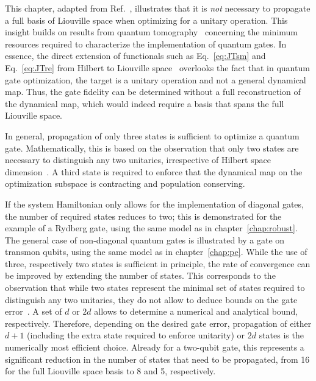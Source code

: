This chapter, adapted from Ref.~\cite{Goerz3States}, illustrates that it is
\emph{not} necessary to propagate a full basis of Liouville space when
optimizing for a unitary operation. This insight builds on results from quantum
tomography~\cite{ReichKochPRA13, ReichKochPRL13, ReichPhD2015} concerning the minimum
resources required to characterize the implementation of quantum gates.
In essence, the direct extension of functionals such as Eq.~\eqref{eq:JTsm} and
Eq.~\eqref{eq:JTre} from Hilbert to
Liouville space~\cite{KallushPRA06,OhtsukiNJP10,ToSHJPB11}
overlooks the fact that in quantum gate optimization,
the target is a unitary operation and not a general dynamical map.
Thus, the gate fidelity can be determined without a full reconstruction of the
dynamical map, which would indeed require a basis that spans the full Liouville
space.

In general, propagation of only three states is sufficient to optimize a quantum
gate. Mathematically, this is based on the observation that only two states are
necessary to distinguish any two unitaries, irrespective of Hilbert space
dimension~\cite{ReichKochPRA13}.
A third state is required to enforce that the dynamical map on the optimization
subspace is contracting and population conserving.

\enlargethispage{\baselineskip}
If the system Hamiltonian only allows for the implementation of diagonal
gates, the number of required states reduces to two; this is demonstrated for
the example of a Rydberg gate, using the same model as in
chapter~\ref{chap:robust}. The general case of non-diagonal quantum gates is
illustrated by a \sqrtISWAP{} gate on transmon qubits, using the same model as
in chapter~\ref{chap:pe}.  While the use of three, respectively two states is
sufficient in principle, the rate of convergence can be improved by extending
the number of states. This corresponds to the observation that while
two states represent the minimal set of states required to
distinguish any two unitaries, they do not allow to deduce bounds on the gate
error~\cite{ReichKochPRA13}. A set of $d$ or $2d$ allows to determine
a numerical and analytical bound, respectively.
Therefore, depending on the desired gate error, propagation of either $d+1$
(including the extra state required to enforce unitarity) or
$2d$ states is the numerically most efficient choice. Already for a two-qubit
gate, this represents a significant reduction in the number of
states that need to be propagated, from 16 for the full Liouville space basis to
8 and 5, respectively.



